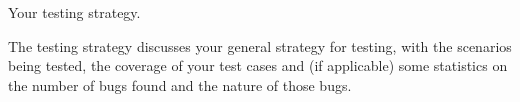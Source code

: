 Your testing strategy.

The testing strategy discusses your general strategy for testing, with the scenarios being tested, the coverage of your test cases and (if applicable) some statistics on the number of bugs found and the nature of those bugs.
